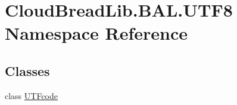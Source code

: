 \hypertarget{namespace_cloud_bread_lib_1_1_b_a_l_1_1_u_t_f8}{}\section{Cloud\+Bread\+Lib.\+B\+A\+L.\+U\+T\+F8 Namespace Reference}
\label{namespace_cloud_bread_lib_1_1_b_a_l_1_1_u_t_f8}
\subsection*{Classes}
\begin{DoxyCompactItemize}
\item 
class \hyperlink{class_cloud_bread_lib_1_1_b_a_l_1_1_u_t_f8_1_1_u_t_fcode}{U\+T\+Fcode}
\end{DoxyCompactItemize}
